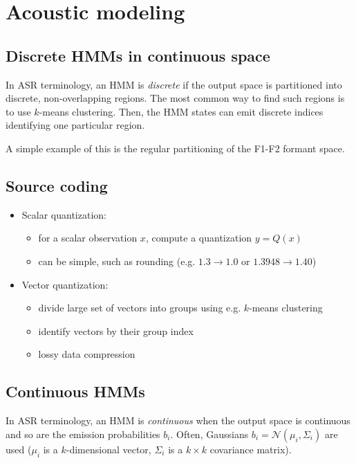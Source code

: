 \documentclass[11pt]{article}
\begin{document}
\section{Acoustic modeling}

\subsection{Discrete HMMs in continuous space}

In ASR terminology, an HMM is \textit{discrete} if the output space is partitioned into discrete, non-overlapping regions. The most common way to find such regions is to use $k$-means clustering. Then, the HMM states can emit discrete indices identifying one particular region.

A simple example of this is the regular partitioning of the F1-F2 formant space.

\subsection{Source coding}

\begin{itemize}
    \item Scalar quantization:
        \begin{itemize}
            \item for a scalar observation $x$, compute a quantization $y = Q(x)$
            \item can be simple, such as rounding (e.g. $1.3 \rightarrow 1.0$ or $1.3948 \rightarrow 1.40$)
        \end{itemize}
    \item Vector quantization:
        \begin{itemize}
            \item divide large set of vectors into groups using e.g. $k$-means clustering
            \item identify vectors by their group index
            \item lossy data compression
        \end{itemize}
\end{itemize}

\subsection{Continuous HMMs}

In ASR terminology, an HMM is \textit{continuous} when the output space is continuous and so are the emission probabilities $b_i$. Often, Gaussians $b_i = \mathcal{N}(\mu_i, \Sigma_i)$ are used ($\mu_i$ is a $k$-dimensional vector, $\Sigma_i$ is a $k \times k$ covariance matrix).
\end{document}

